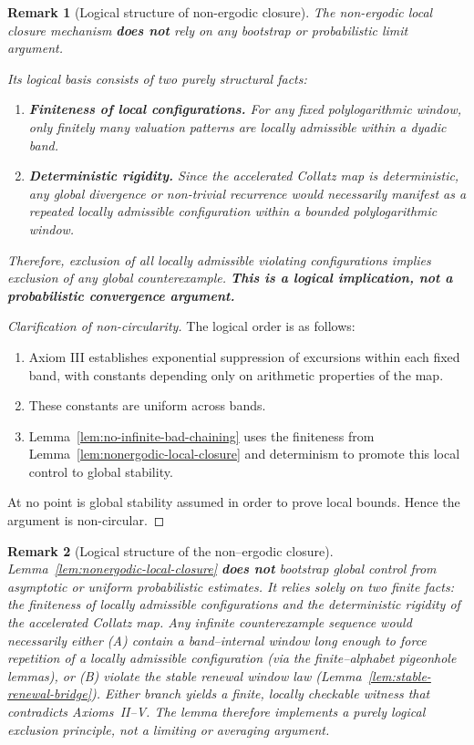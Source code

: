 \documentclass[preprint,12pt]{elsarticle}
\newtheorem{remark}{Remark}
\begin{document}
\begin{remark}[Logical structure of non-ergodic closure]
\label{rem:non-circular-structure}
The non-ergodic local closure mechanism \textbf{does not} rely on any bootstrap
or probabilistic limit argument.

Its logical basis consists of two purely structural facts:
\begin{enumerate}
\item \textbf{Finiteness of local configurations.}
For any fixed polylogarithmic window, only finitely many valuation patterns
are locally admissible within a dyadic band.
\item \textbf{Deterministic rigidity.}
Since the accelerated Collatz map is deterministic,
any global divergence or non-trivial recurrence would necessarily
manifest as a repeated locally admissible configuration
within a bounded polylogarithmic window.
\end{enumerate}

Therefore, exclusion of all locally admissible violating configurations
implies exclusion of any global counterexample.
\textbf{This is a logical implication, not a probabilistic convergence argument.}
\end{remark}

\begin{proof}[Clarification of non-circularity]
The logical order is as follows:
\begin{enumerate}
\item Axiom III establishes exponential suppression of excursions
within each fixed band, with constants depending only on arithmetic properties
of the map.
\item These constants are uniform across bands.
\item Lemma~\ref{lem:no-infinite-bad-chaining} uses the finiteness from Lemma~\ref{lem:nonergodic-local-closure} and determinism to promote this local control
to global stability.
\end{enumerate}
At no point is global stability assumed in order to prove local bounds.
Hence the argument is non-circular.
\end{proof}

\begin{remark}[Logical structure of the non--ergodic closure]
\label{rem:nonergodic-closure-logic}
Lemma~\ref{lem:nonergodic-local-closure} \textbf{does not} bootstrap global control
from asymptotic or uniform probabilistic estimates.
It relies solely on two finite facts: the finiteness of locally
admissible configurations and the deterministic rigidity of the
accelerated Collatz map.
Any infinite counterexample sequence would necessarily either (A) contain a band--internal window
long enough to force repetition of a locally admissible configuration (via the finite--alphabet
pigeonhole lemmas), or (B) violate the stable renewal window law (Lemma~\ref{lem:stable-renewal-bridge}).
Either branch yields a finite, locally checkable witness that contradicts Axioms~II--V.
The lemma therefore implements a purely logical exclusion principle,
not a limiting or averaging argument.
\end{remark}
\end{document}
